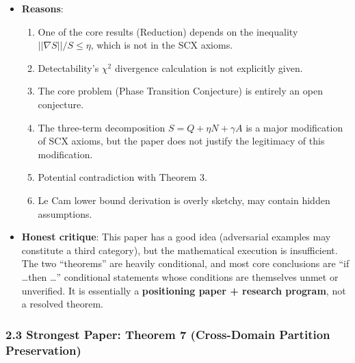 \documentclass[
  12pt,
]{article}
\providecommand{\tightlist}{%
  \setlength{\itemsep}{0pt}\setlength{\parskip}{0pt}}
\begin{document}
\begin{itemize}
\tightlist
\item
  \textbf{Reasons}:
  \begin{enumerate}
  \def\labelenumi{\arabic{enumi}.}
  \tightlist
  \item
    One of the core results (Reduction) depends on the inequality $||\nabla S||/S \leq \eta$, which is not in the SCX axioms.
  \item
    Detectability's $\chi^2$ divergence calculation is not explicitly given.
  \item
    The core problem (Phase Transition Conjecture) is entirely an open conjecture.
  \item
    The three-term decomposition $S=Q+\eta N+\gamma A$ is a major modification of SCX axioms, but the paper does not justify the legitimacy of this modification.
  \item
    Potential contradiction with Theorem 3.
  \item
    Le Cam lower bound derivation is overly sketchy, may contain hidden assumptions.
  \end{enumerate}
\item
  \textbf{Honest critique}: This paper has a good idea (adversarial examples may constitute a third category), but the mathematical execution is insufficient. The two ``theorems'' are heavily conditional, and most core conclusions are ``if \ldots then \ldots'' conditional statements whose conditions are themselves unmet or unverified. It is essentially a \textbf{positioning paper + research program}, not a resolved theorem.
\end{itemize}

\subsubsection{2.3 Strongest Paper: \textbf{Theorem 7 (Cross-Domain Partition Preservation)}}\label{strongest-paper-theorem-7-cross-domain-partition-preservation}
\end{document}
